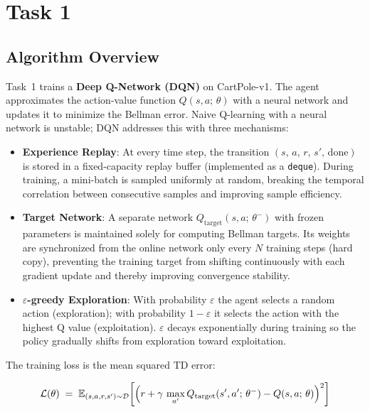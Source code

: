 \documentclass[12pt,a4paper]{report}
\begin{document}
\section{Task 1}

\subsection{Algorithm Overview}

Task~1 trains a \textbf{Deep Q-Network (DQN)} on CartPole-v1.
The agent approximates the action-value function $Q(s, a;\,\theta)$ with a neural network
and updates it to minimize the Bellman error.
Naive Q-learning with a neural network is unstable; DQN addresses this with three mechanisms:

\begin{itemize}[leftmargin=1.8em]
  \item \textbf{Experience Replay}: At every time step, the transition
        $(s,\,a,\,r,\,s',\,\text{done})$ is stored in a fixed-capacity replay buffer
        (implemented as a \texttt{deque}).
        During training, a mini-batch is sampled uniformly at random, breaking the temporal
        correlation between consecutive samples and improving sample efficiency.

  \item \textbf{Target Network}: A separate network $Q_{\text{target}}(s,a;\,\theta^-)$ with
        frozen parameters is maintained solely for computing Bellman targets.
        Its weights are synchronized from the online network only every $N$ training steps
        (hard copy), preventing the training target from shifting continuously with each
        gradient update and thereby improving convergence stability.

  \item \textbf{$\varepsilon$-greedy Exploration}: With probability $\varepsilon$ the agent
        selects a random action (exploration); with probability $1-\varepsilon$ it selects the
        action with the highest Q value (exploitation).
        $\varepsilon$ decays exponentially during training so the policy gradually shifts from
        exploration toward exploitation.
\end{itemize}

The training loss is the mean squared TD error:

\begin{equation}
  \mathcal{L}(\theta) \;=\;
  \mathbb{E}_{(s,a,r,s')\sim\mathcal{D}}\!\left[
    \Bigl(r + \gamma\,\max_{a'} Q_{\text{target}}(s',a';\,\theta^-) - Q(s,a;\,\theta)\Bigr)^2
  \right]
\end{equation}
\end{document}
